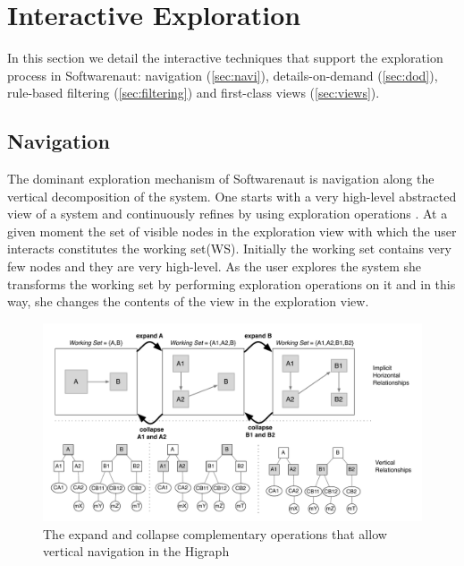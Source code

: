 \documentclass[preprint,12pt]{elsarticle}
\begin{document}
\section {Interactive Exploration}
\label {sec:interact}

In this section we detail the interactive techniques that support the exploration process in Softwarenaut: 
navigation (\ref{sec:navi}), 
details-on-demand (\ref{sec:dod}),
rule-based filtering (\ref{sec:filtering}) and
first-class views (\ref{sec:views}).  

\subsection{Navigation}

The dominant exploration mechanism of Softwarenaut is navigation along the vertical decomposition of the system. One starts with a very high-level abstracted view of a system and continuously refines by using exploration operations \cite{robertson-conetrees}. At a given moment the set of visible nodes in the exploration view with which the user interacts constitutes the working set(WS). Initially the working set contains very few nodes and they are very high-level. As the user explores the system she transforms the working set by performing exploration operations on it and in this way, she changes the contents of the view in the exploration view.


\begin{figure}[b!]
\begin{center}
\includegraphics[width=\linewidth]{images/SnautSequence}
\caption{The expand and collapse complementary operations that allow vertical navigation in the Higraph}
\label{}
\end{center}
\end{figure}
\end{document}
